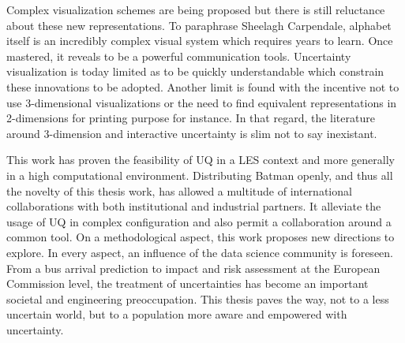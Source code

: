 \begin{itemize}
Complex visualization schemes are being proposed but there is still reluctance about these new representations. To paraphrase Sheelagh Carpendale, alphabet itself is an incredibly complex visual system which requires years to learn. Once mastered, it reveals to be a powerful communication tools. Uncertainty visualization is today limited as to be quickly understandable which constrain these innovations to be adopted. Another limit is found with the incentive not to use 3-dimensional visualizations or the need to find equivalent representations in 2-dimensions for printing purpose for instance. In that regard, the literature around 3-dimension and interactive uncertainty is slim not to say inexistant.
\end{itemize}

This work has proven the feasibility of UQ in a LES context and more generally in a high computational environment. Distributing Batman openly, and thus all the novelty of this thesis work, has allowed a multitude of international collaborations with both institutional and industrial partners. It alleviate the usage of UQ in complex configuration and also permit a collaboration around a common tool. On a methodological aspect, this work proposes new directions to explore. In every aspect, an influence of the data science community is foreseen. From a bus arrival prediction to impact and risk assessment at the European Commission level, the treatment of uncertainties has become an important societal and engineering preoccupation. This thesis paves the way, not to a less uncertain world, but to a population more aware and empowered with uncertainty.








